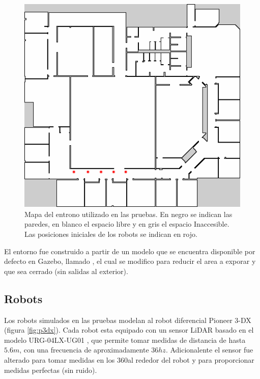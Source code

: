 \begin{figure}[H]
  \center
  \includegraphics[width=0.5\linewidth]{imagenes/willow/0_250000mRobots2.png}
  \caption[Mapa del entrono utilizado en las pruebas.]{Mapa del entrono utilizado en las pruebas. En negro se indican las paredes, en blanco el espacio libre y en gris el espacio Inaccesible. Las posiciones iniciales de los robots se indican en rojo.}
  \label{fig:willow}
\end{figure} 

El entorno fue construido a partir de un modelo que se encuentra disponible por
defecto en Gazebo, llamado , el cual se modifico para
reducir el area a exporar y que sea cerrado (sin salidas al exterior).

\subsection{Robots}
Los robots simulados en las pruebas modelan al robot diferencial Pioneer 3-DX
\cite{p3dx} (figura \ref{fig:p3dx}). Cada robot esta equipado con un sensor LiDAR basado en el modelo
URG-04LX-UG01 \cite{hokuyo}, que permite tomar medidas de distancia de hasta
$5.6m$, con una frecuencia de aproximadamente $36hz$. Adicionalente el sensor
fue alterado para tomar medidas en los $360$\textdegree al rededor del robot y
para proporcionar medidas perfectas (sin ruido). %

